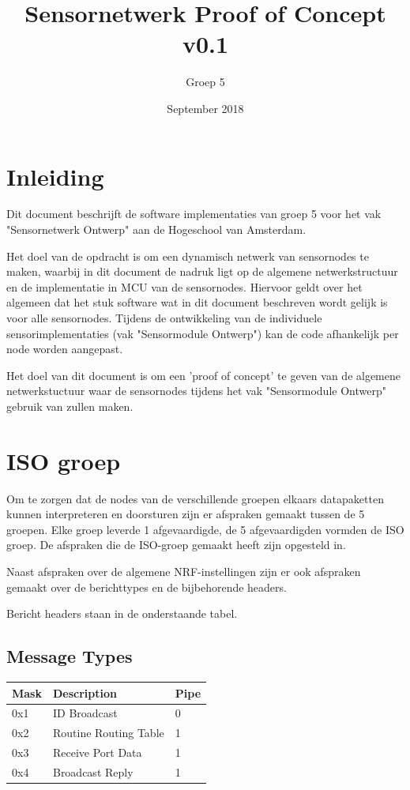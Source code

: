 \documentclass[a4paper, 11pt]{article}
\title{Sensornetwerk Proof of Concept v0.1}
\author{Groep 5}
\date{September 2018}
\begin{document}
\maketitle
\clearpage
{}
\clearpage

\section{Inleiding}
Dit document beschrijft de software implementaties van groep 5 voor het vak "Sensornetwerk Ontwerp" aan de Hogeschool van Amsterdam.

Het doel van de opdracht is om een dynamisch netwerk van sensornodes te maken, waarbij in dit document de nadruk ligt op de algemene netwerkstructuur en de implementatie in MCU van de sensornodes. Hiervoor geldt over het algemeen dat het stuk software wat in dit document beschreven wordt gelijk is voor alle sensornodes. Tijdens de ontwikkeling van de individuele sensorimplementaties (vak "Sensormodule Ontwerp") kan de code afhankelijk per node worden aangepast. 

Het doel van dit document is om een 'proof of concept' te geven van de algemene netwerkstuctuur waar de sensornodes tijdens het vak "Sensormodule Ontwerp" gebruik van zullen maken.


\section{ISO groep}
Om te zorgen dat de nodes van de verschillende groepen elkaars datapaketten kunnen interpreteren en doorsturen zijn er afspraken gemaakt tussen de 5 groepen. Elke groep leverde 1 afgevaardigde, de 5 afgevaardigden vormden de ISO groep. De afspraken die de ISO-groep gemaakt heeft zijn opgesteld in\cite{ISO}. 

Naast afspraken over de algemene NRF-instellingen zijn er ook afspraken gemaakt over de berichttypes en de bijbehorende headers.

Bericht headers staan in de onderstaande tabel.
\subsection*{Message Types}
\begin{table}[h]
\begin{tabular}{|l|l|l|}
\hline
\rowcolor[HTML]{EFEFEF} 
Mask & Description           & Pipe \\ \hline
0x1  & ID Broadcast          & 0    \\ \hline
0x2  & Routine Routing Table & 1    \\ \hline
0x3  & Receive Port Data     & 1    \\ \hline
0x4  & Broadcast Reply       & 1    \\ \hline
\end{tabular}
\end{table}
\end{document}
